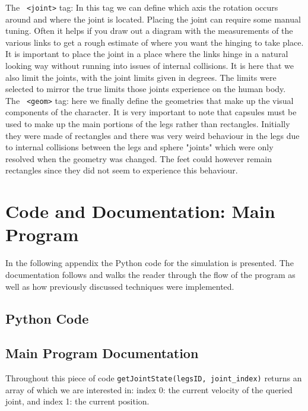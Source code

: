 \documentclass[12pt, a4paper]{article}
\begin{document}
The \verb; <joint>; tag: In this tag we can define which axis the rotation occurs around and where the joint is located. Placing the joint can require some manual tuning. Often it helps if you draw out a diagram with the measurements of the various links to get a rough estimate of where you want the hinging to take place. It is important to place the joint in a place where the links hinge in a natural looking way without running into issues of internal collisions. It is here that we also limit the joints, with the joint limits given in degrees. The limits were selected to mirror the true limits those joints experience on the human body. \\

The \verb; <geom>; tag: here we finally define the geometries that make up the visual components of the character. It is very important to note that capsules must be used to make up the main portions of the legs rather than rectangles. Initially they were made of rectangles and there was very weird behaviour in the legs due to internal collisions between the legs and sphere "joints" which were only resolved when the geometry was changed. The feet could however remain rectangles since they did not seem to experience this behaviour.\\ 




\section{Code and Documentation: Main Program}
\label{apdx: main program}
In the following appendix the Python code for the simulation is presented. The documentation follows and walks the reader through the flow of the program as well as how previously discussed techniques were implemented.  
\subsection{Python Code}


\subsection{Main Program Documentation}

Throughout this piece of code \verb;getJointState(legsID, joint_index); returns an array of which we are interested in: index 0: the current velocity of the queried joint, and index 1: the current position.\\
\end{document}
